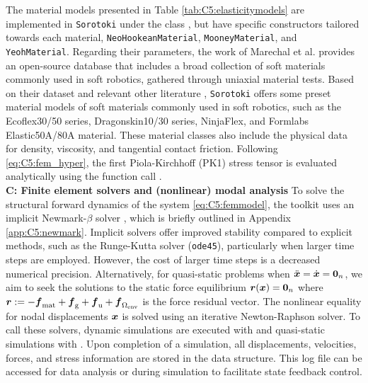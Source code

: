 The material models presented in Table \ref{tab:C5:elasticitymodels} are implemented in \texttt{Sorotoki} under the class , but have specific constructors tailored towards each material, \texttt{NeoHookeanMaterial}, \texttt{MooneyMaterial}, and \texttt{YeohMaterial}. Regarding their parameters, the work of Marechal et al. \cite{Marechal2021Jun} provides an open-source database that includes a broad collection of soft materials commonly used in soft robotics, gathered through uniaxial material tests. Based on their dataset and relevant other literature \cite{Xavier2022Jun,Smith2018,Kim2018,Goury2018}, \texttt{Sorotoki} offers some preset material models of soft materials commonly used in soft robotics, such as the Ecoflex30/50 series, Dragonskin10/30 series, NinjaFlex, and Formlabs Elastic50A/80A material. These material classes also include the physical data for density, viscosity, and tangential contact friction. Following \eqref{eq:C5:fem_hyper}, the first Piola-Kirchhoff (PK1) stress tensor is evaluated analytically using the function call .  \\
%

\textbf{C: Finite element solvers and (nonlinear) modal analysis}
To solve the structural forward dynamics of the system \eqref{eq:C5:femmodel}, the toolkit uses an implicit Newmark-$\beta$ solver \cite{Newmark1959Jul}, which is briefly outlined in Appendix \ref{app:C5:newmark}. Implicit solvers offer improved stability compared to explicit methods, such as the Runge-Kutta solver (\texttt{ode45}), particularly when larger time steps are employed. However, the cost of larger time steps is a decreased numerical precision.  Alternatively, for quasi-static problems when ${\ddot{\boldsymbol{x}}} = {\dot{\boldsymbol{x}}} = \boldsymbol{0}_n$, we aim to seek the solutions to the static force equilibrium ${\boldsymbol{r}}({\boldsymbol{x}}) = \boldsymbol{0}_n$ where ${\boldsymbol{r}} := -{\boldsymbol{f}}_{\textrm{mat}} + {\boldsymbol{f}}_{\scriptstyle\textrm{g}} + {\boldsymbol{f}}_\textrm{u} + {\boldsymbol{f}}_{\Omega_{\textrm{env}}}$ is the force residual vector. The nonlinear equality for nodal displacements ${\boldsymbol{x}}$ is solved using an iterative Newton-Raphson solver. To call these solvers, dynamic simulations are executed with  and quasi-static simulations with . Upon completion of a simulation, all displacements, velocities, forces, and stress information are stored in the  data structure. This log file can be accessed for data analysis or during simulation to facilitate state feedback control.

